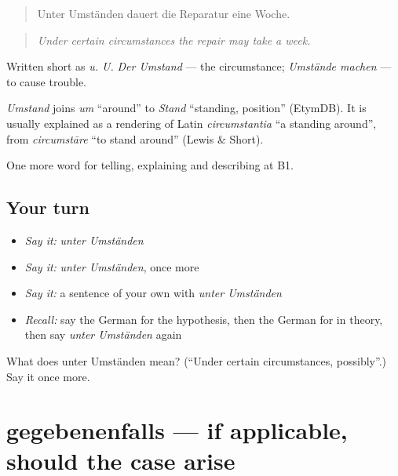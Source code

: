 \begin{quote}
Unter Umständen dauert die Reparatur eine Woche.
\end{quote}

\begin{quote}
\emph{Under certain circumstances the repair may take a week.}
\end{quote}

Written short as \emph{u. U.} \emph{Der Umstand} — the circumstance; \emph{Umstände machen} — to cause trouble.

\begin{cousinweb}
\emph{Umstand} joins \emph{um} \textquotedblleft{}around\textquotedblright{} to \emph{Stand} \textquotedblleft{}standing, position\textquotedblright{} (EtymDB). It is usually explained as a rendering of Latin \emph{circumstantia} \textquotedblleft{}a standing around\textquotedblright{}, from \emph{circumstāre} \textquotedblleft{}to stand around\textquotedblright{} (Lewis \& Short).
\end{cousinweb}

\begin{grammarlens}[title={What you've built}]
One more word for telling, explaining and describing at B1.
\end{grammarlens}

\subsection*{Your turn}
\begin{itemize}
\raggedright
  \item \emph{Say it:} \emph{unter Umständen}
  \item \emph{Say it:} \emph{unter Umständen}, once more
  \item \emph{Say it:} a sentence of your own with \emph{unter Umständen}
  \item \emph{Recall:} say the German for the hypothesis, then the German for in theory, then say \emph{unter Umständen} again
\end{itemize}

\begin{tcolorbox}[breakable,colback=teal!4,colframe=teal!35!black,title={Before you move on}]
What does unter Umständen mean? (\textquotedblleft{}Under certain circumstances, possibly\textquotedblright{}.) Say it once more.
\end{tcolorbox}
\section[gegebenenfalls]{gegebenenfalls — if applicable, should the case arise}

